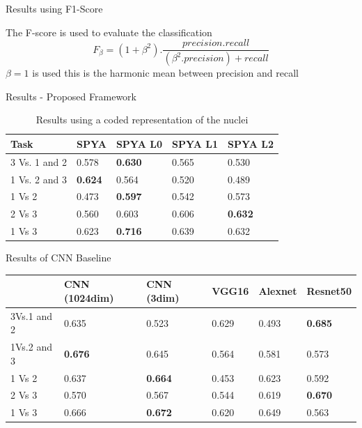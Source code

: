 \documentclass[usenames,dvipsnames]{beamer}
\begin{document}
\begin{frame}{Results using F1-Score}

The F-score is used to evaluate the classification
\begin{equation}
    F_{\beta} = (1+\beta^{2}).\frac{precision.recall}{(\beta^{2}.precision)+recall}
\end{equation}
$\beta=1$ is used this is the harmonic mean between precision and recall
\end{frame}


\begin{frame}{Results - Proposed Framework}

\begin{table}[]
\begin{tabular}{|l|l|l|l|l|}
\hline
Task & SPYA   & SPYA L0 & SPYA L1 & SPYA L2                      \\ \hline
3 Vs. 1 and 2 & 0.578 & \textbf{0.630} & 0.565  & \multicolumn{1}{l|}{0.530}  \\ \hline
1 Vs. 2 and 3 & \textbf{0.624} & 0.564 & 0.520  & \multicolumn{1}{l|}{0.489} \\ \hline
1 Vs 2        & 0.473 & \textbf{0.597} & 0.542  & \multicolumn{1}{l|}{0.573} \\ \hline
2 Vs 3        & 0.560 & 0.603 &0.606  & \multicolumn{1}{l|}{ \textbf{0.632}} \\ \hline
1 Vs 3        & 0.623 & \textbf{0.716} & 0.639  & \multicolumn{1}{l|}{0.632} \\ \hline
\end{tabular}
\caption{Results using a coded representation of the nuclei}
\end{table}

\end{frame}


\begin{frame}{Results of CNN Baseline}
\begin{table}[]
\begin{tabular}{|p{1.5cm}|p{1.4cm}|p{1.3cm}|p{1.3cm}|p{1.3cm}|p{1.3cm}|}
\hline
              & CNN (1024dim)  & CNN (3dim)     & VGG16 & Alexnet & Resnet50       \\ \hline
3Vs.1 and 2 & 0.635          & 0.523          & 0.629 & 0.493  & \textbf{0.685} \\ \hline
1Vs.2 and 3 & \textbf{0.676} & 0.645          & 0.564 & 0.581  & 0.573          \\ \hline
1 Vs 2        & 0.637         & \textbf{0.664} & 0.453 & 0.623   & 0.592         \\ \hline
2 Vs 3        & 0.570          & 0.567          & 0.544 & 0.619   & \textbf{0.670} \\ \hline
1 Vs 3        & 0.666         & \textbf{0.672} & 0.620 & 0.649   & 0.563          \\ \hline
\end{tabular}
\end{table}    



\end{frame}
\end{document}
